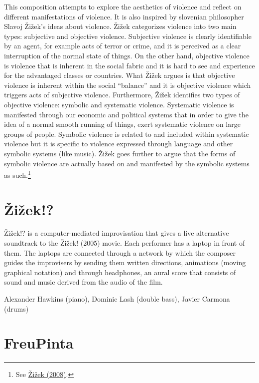  This composition attempts to explore the aesthetics of violence and reflect on different manifestations of violence. It is also inspired by slovenian philosopher Slavoj \v{Z}i\v{z}ek's ideas about violence. \v{Z}i\v{z}ek categorizes violence into two main types: subjective and objective violence. Subjective violence is clearly identifiable by an agent, for example acts of terror or crime, and it is perceived as a clear interruption of the normal state of things. On the other hand, objective violence is  violence that is inherent in the social fabric and it is hard to see and experience for the advantaged classes or countries. What \v{Z}i\v{z}ek argues is that objective violence is inherent within the social ``balance'' and it is objective violence which triggers acts of subjective violence. Furthermore, \v{Z}i\v{z}ek identifies two types of objective violence: symbolic and systematic violence. Systematic violence is manifested through our economic and political systems that in order to give the idea of a normal smooth running of things, exert systematic violence on large groups of people. Symbolic violence is related to and included within systematic violence but it is specific to violence expressed through language and other symbolic systems (like music). \v{Z}i\v{z}ek goes further to argue that the forms of symbolic violence are actually based on and manifested by the symbolic systems as such.\footnote{See \hyperlink{zizekviolence}{\v{Z}i\v{z}ek (2008)}.} 

\section{\v{Z}i\v{z}ek!?}

\v{Z}i\v{z}ek!? is a computer-mediated improvisation that gives a live alternative soundtrack to the \v{Z}i\v{z}ek! (2005) movie. Each performer has a laptop in front of them. The laptops are connected through a network by which the composer guides the improvisers by sending them written directions, animations (moving graphical notation) and through headphones, an aural score that consists of sound and music derived from the audio of the film. 

Alexander Hawkins (piano), Dominic Lash (double bass), Javier Carmona (drums)

\section{FreuPinta}


